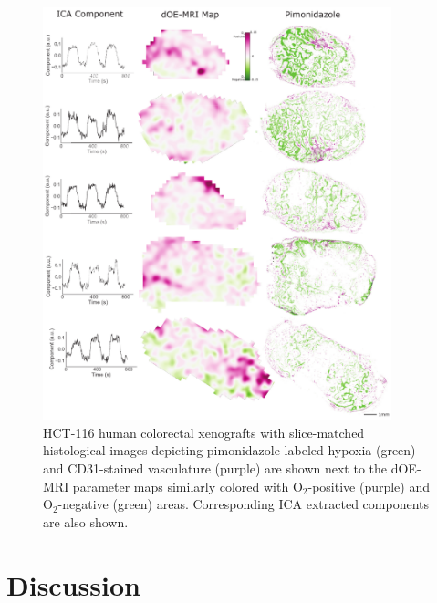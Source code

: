 \begin{figure}[htbp]
   \centering
   \includegraphics[width=0.9\textwidth]{oemri_thesis1/oemri_thesis1-images/fig7_hct116.pdf} %
   \caption{HCT-116 human colorectal xenografts with slice-matched histological images depicting pimonidazole-labeled hypoxia (green) and \ac{CD31}-stained vasculature (purple) are shown next to the \ac{dOE-MRI} parameter maps similarly colored with O$_2$-positive (purple) and O$_2$-negative (green) areas. Corresponding \ac{ICA} extracted components are also shown.
   \label{fig_hct116}}
\end{figure}


\section{Discussion}

